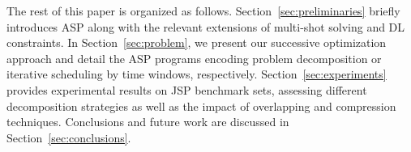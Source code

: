\documentclass{tlp} %
\begin{document}
The rest of this 
paper is organized as follows.
Section~\ref{sec:preliminaries} briefly introduces ASP along with the relevant
extensions of multi-shot solving and DL constraints.
In Section~\ref{sec:problem}, we present our successive optimization approach
and detail the ASP programs encoding problem decomposition or iterative scheduling by
time windows, respectively.
Section~\ref{sec:experiments} provides experimental results on JSP benchmark sets, %
assessing different decomposition strategies as well as the impact of overlapping and
compression techniques.
Conclusions and future work are discussed in Section~\ref{sec:conclusions}.  

\end{document}
